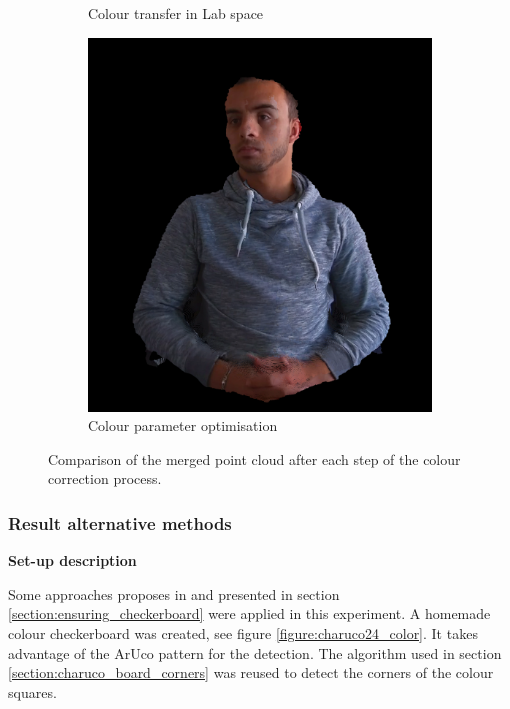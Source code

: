 \begin{figure}[H]
\begin{subfigure}[b]{0.32 \textwidth}
    \caption{Colour transfer in Lab space}
    \label{figure:overlap_region_lab_2}
  \end{subfigure}
  \hfill
  \begin{subfigure}[b]{0.32 \textwidth}
    \includegraphics[width=\textwidth]{images/visual_enhancement/colour/param_opt_lab.png}
    \caption{Colour parameter optimisation}
    \label{figure:param_opt_lab_2}
  \end{subfigure}
  \caption{Comparison of the merged point cloud after each step of the colour correction process.}
  \label{figure:summary_colour_correction}
\end{figure}


\subsubsection{ Result alternative methods}

\label{section:exp_ens_checkerboard}
\textbf{Set-up description}

Some approaches proposes in \cite{ilie_ensuring_2005} and presented in section \ref{section:ensuring_checkerboard} were applied in this experiment. A homemade colour checkerboard was created, see figure \ref{figure:charuco24_color}. It takes advantage of the ArUco pattern for the detection. The algorithm used in section \ref{section:charuco_board_corners} was reused to detect the corners of the colour squares.

